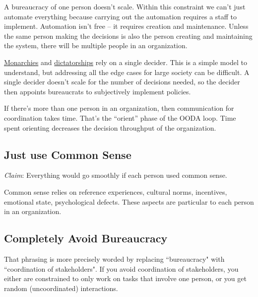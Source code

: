 A bureaucracy of one person doesn't scale. Within this constraint we can't just automate everything because carrying out the automation requires a staff to implement. Automation isn't free -- it requires creation and maintenance. Unless the same person making the decisions is also the person creating and maintaining the system, there will be multiple people in an organization.


\href{https://en.wikipedia.org/wiki/Monarchy}{Monarchies} and \href{https://en.wikipedia.org/wiki/Dictator}{dictatorships} rely on a single decider. This is a simple model to understand, but addressing all the edge cases for large society can be difficult. A single decider doesn't scale for the number of decisions needed, so the decider then appoints bureaucrats to subjectively implement policies. 



If there's more than one person in an organization, then communication for coordination takes time. That's the ``orient'' phase of the OODA loop. Time spent orienting decreases the decision throughput of the organization.



\subsection{Just use Common Sense}
\textit{Claim}: Everything would go smoothly if each person used common sense.

Common sense relies on reference experiences, cultural norms, incentives, emotional state, psychological defects. These aspects are particular to each person in an organization. 


\subsection{Completely Avoid Bureaucracy}
That phrasing is more precisely worded by replacing ``bureaucracy" with ``coordination of stakeholders". If you avoid coordination of stakeholders, you either are constrained to only work on tasks that involve one person, or you get random (uncoordinated) interactions. 

